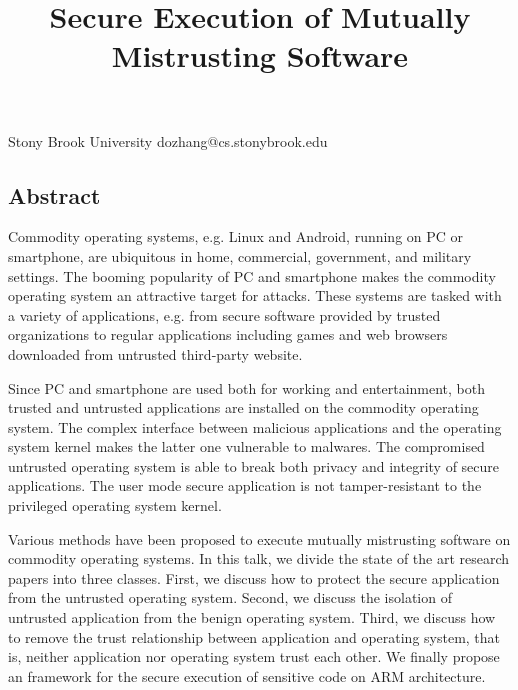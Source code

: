 \documentclass[10pt,reprint]{socc14}
\begin{document}
\date{}

\title{Secure Execution of Mutually Mistrusting Software}
\subtitle{}


           {Stony Brook University}
		   {dozhang@cs.stonybrook.edu}

\maketitle
%
%

\subsection*{Abstract}
Commodity operating systems, e.g. Linux and Android, running on PC or
smartphone, are ubiquitous in home, commercial, government, and military
settings. The booming popularity of PC and smartphone makes the commodity
operating system an attractive target for attacks. These systems are tasked with
a variety of applications, e.g. from secure software provided by trusted
organizations to regular applications including games and web browsers
downloaded from untrusted third-party website.

Since PC and smartphone are used both for working and entertainment, both
trusted and untrusted applications are installed on the commodity operating
system. The complex interface between malicious applications and the operating
system kernel makes the latter one vulnerable to malwares. The compromised
untrusted operating system is able to break both privacy and integrity of secure
applications. The user mode secure application is not tamper-resistant to the
privileged operating system kernel.

Various methods have been proposed to execute mutually mistrusting software on
commodity operating systems. In this talk, we divide the state of the art
research papers into three classes. First, we discuss how to protect the secure
application from the untrusted operating system. Second, we discuss the
isolation of untrusted application from the benign operating system. Third, we
discuss how to remove the trust relationship between application and operating
system, that is, neither application nor operating system trust each other. We
finally propose an framework for the secure execution of sensitive code on ARM
architecture.











\end{document}
